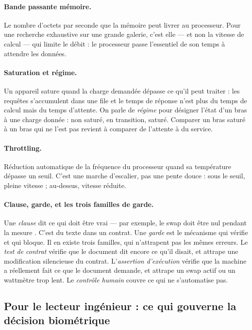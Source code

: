 \documentclass[11pt,a4paper]{article}
\newcommand{\terme}[1]{\emph{#1}}
\begin{document}
\paragraph{Bande passante mémoire.} Le nombre d'octets par seconde que la mémoire
peut livrer au processeur. Pour une recherche exhaustive sur une grande galerie,
c'est elle — et non la vitesse de calcul — qui limite le débit : le processeur passe
l'essentiel de son temps à attendre les données.

\paragraph{Saturation et régime.} Un appareil sature quand la charge demandée
dépasse ce qu'il peut traiter : les requêtes s'accumulent dans une file et le temps
de réponse n'est plus du temps de calcul mais du temps d'attente. On parle de
\terme{régime} pour désigner l'état d'un bras à une charge donnée : non saturé, en
transition, saturé. Comparer un bras saturé à un bras qui ne l'est pas revient à
comparer de l'attente à du service.

\paragraph{Throttling.} Réduction automatique de la fréquence du processeur quand sa
température dépasse un seuil. C'est une marche d'escalier, pas une pente douce :
sous le seuil, pleine vitesse ; au-dessus, vitesse réduite.

\paragraph{Clause, garde, et les trois familles de garde.} Une \terme{clause} dit ce
qui doit être vrai — par exemple, \og le swap doit être nul pendant la mesure \fg.
C'est du texte dans un contrat. Une \terme{garde} est le mécanisme qui vérifie et
qui bloque. Il en existe trois familles, qui n'attrapent pas les mêmes erreurs. Le
\terme{test de contrat} vérifie que le document dit encore ce qu'il disait, et
attrape une modification silencieuse du contrat. L'\terme{assertion d'exécution}
vérifie que la machine a réellement fait ce que le document demande, et attrape un
swap actif ou un wattmètre trop lent. Le \terme{contrôle humain} couvre ce qui ne
s'automatise pas.

\subsection{Pour le lecteur ingénieur : ce qui gouverne la décision biométrique}
\end{document}
